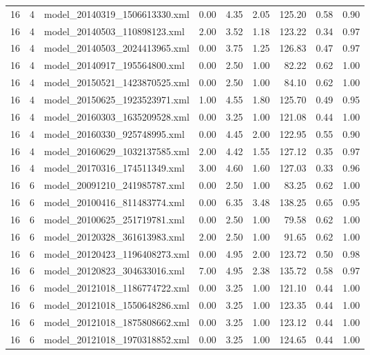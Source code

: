 \begin{table}[ht]
\begin{tabular}{rrlrrrrrr}
   16 &   4 & model\_20140319\_1506613330.xml & 0.00 & 4.35 & 2.05 & 125.20 & 0.58 & 0.90 \\ 
   16 &   4 & model\_20140503\_110898123.xml & 2.00 & 3.52 & 1.18 & 123.22 & 0.34 & 0.97 \\ 
   16 &   4 & model\_20140503\_2024413965.xml & 0.00 & 3.75 & 1.25 & 126.83 & 0.47 & 0.97 \\ 
   16 &   4 & model\_20140917\_195564800.xml & 0.00 & 2.50 & 1.00 & 82.22 & 0.62 & 1.00 \\ 
   16 &   4 & model\_20150521\_1423870525.xml & 0.00 & 2.50 & 1.00 & 84.10 & 0.62 & 1.00 \\ 
   16 &   4 & model\_20150625\_1923523971.xml & 1.00 & 4.55 & 1.80 & 125.70 & 0.49 & 0.95 \\ 
   16 &   4 & model\_20160303\_1635209528.xml & 0.00 & 3.25 & 1.00 & 121.08 & 0.44 & 1.00 \\ 
   16 &   4 & model\_20160330\_925748995.xml & 0.00 & 4.45 & 2.00 & 122.95 & 0.55 & 0.90 \\ 
   16 &   4 & model\_20160629\_1032137585.xml & 2.00 & 4.42 & 1.55 & 127.12 & 0.35 & 0.97 \\ 
   16 &   4 & model\_20170316\_174511349.xml & 3.00 & 4.60 & 1.60 & 127.03 & 0.33 & 0.96 \\ 
   16 &   6 & model\_20091210\_241985787.xml & 0.00 & 2.50 & 1.00 & 83.25 & 0.62 & 1.00 \\ 
   16 &   6 & model\_20100416\_811483774.xml & 0.00 & 6.35 & 3.48 & 138.25 & 0.65 & 0.95 \\ 
   16 &   6 & model\_20100625\_251719781.xml & 0.00 & 2.50 & 1.00 & 79.58 & 0.62 & 1.00 \\ 
   16 &   6 & model\_20120328\_361613983.xml & 2.00 & 2.50 & 1.00 & 91.65 & 0.62 & 1.00 \\ 
   16 &   6 & model\_20120423\_1196408273.xml & 0.00 & 4.95 & 2.00 & 123.72 & 0.50 & 0.98 \\ 
   16 &   6 & model\_20120823\_304633016.xml & 7.00 & 4.95 & 2.38 & 135.72 & 0.58 & 0.97 \\ 
   16 &   6 & model\_20121018\_1186774722.xml & 0.00 & 3.25 & 1.00 & 121.10 & 0.44 & 1.00 \\ 
   16 &   6 & model\_20121018\_1550648286.xml & 0.00 & 3.25 & 1.00 & 123.35 & 0.44 & 1.00 \\ 
   16 &   6 & model\_20121018\_1875808662.xml & 0.00 & 3.25 & 1.00 & 123.12 & 0.44 & 1.00 \\ 
   16 &   6 & model\_20121018\_1970318852.xml & 0.00 & 3.25 & 1.00 & 124.65 & 0.44 & 1.00 \\ 

\end{tabular}
\end{table}
